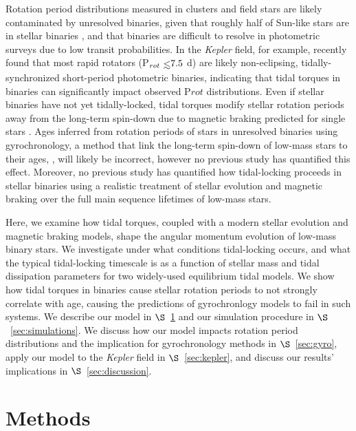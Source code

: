 \documentclass[twocolumn]{aastex61}
\def\lsim{~\rlap{$<$}{\lower 1.0ex\hbox{$\sim$}}}
\newcommand{\kepler}[0]{\textit{Kepler}\xspace}
\begin{document}
Rotation period distributions measured in clusters and field stars are likely contaminated by unresolved binaries, given that roughly half of Sun-like stars are in stellar binaries \citep{Raghavan2010,Duchene2013}, and that binaries are difficult to resolve in photometric surveys due to low transit probabilities. In the \kepler field, for example, \citet{Simonian2018} recently found that most rapid rotators (P$_{rot} \lsim 7.5$ d) are likely non-eclipsing, tidally-synchronized short-period photometric binaries, indicating that tidal torques in binaries can significantly impact observed P${rot}$ distributions.  Even if stellar binaries have not yet tidally-locked, tidal torques modify stellar rotation periods away from the long-term spin-down due to magnetic braking predicted for single stars \citep{Dunn1961,Skumanich1972,Barnes2003}. Ages inferred from rotation periods of stars in unresolved binaries using gyrochronology, a method that link the long-term spin-down of low-mass stars to their ages, \citep{Skumanich1972,Barnes2003,Barnes2007,Mamajek2008,Barnes2010}, will likely be incorrect, however no previous study has quantified this effect.  Moreover, no previous study has quantified how tidal-locking proceeds in stellar binaries using a realistic treatment of stellar evolution and magnetic braking over the full main sequence lifetimes of low-mass stars.


Here, we examine how tidal torques, coupled with a modern stellar evolution and magnetic braking models, shape the angular momentum evolution of low-mass binary stars.  We investigate under what conditions tidal-locking occurs, and what the typical tidal-locking timescale is as a function of stellar mass and tidal dissipation parameters for two widely-used equilibrium tidal models.  We show how tidal torques in binaries cause stellar rotation periods to not strongly correlate with age, causing the predictions of gyrochronlogy models to fail in such systems.  We describe our model in $\S$~\ref{sec:methods} and our simulation procedure in $\S$~\ref{sec:simulations}.  We discuss how our model impacts rotation period distributions and the implication for gyrochronology methods in $\S$~\ref{sec:gyro}, apply our model to the \kepler field in $\S$~\ref{sec:kepler}, and discuss our results' implications in $\S$~\ref{sec:discussion}.


\section{Methods} \label{sec:methods}
\end{document}
